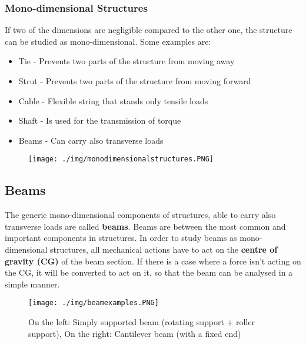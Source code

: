 \subsubsection{Mono-dimensional Structures}
If two of the dimensions are negligible compared to the other one, the structure can be studied as mono-dimensional. Some examples are:
\begin{itemize}[noitemsep]
  \item Tie - Prevents two parts of the structure from moving away
  \item Strut - Prevents two parts of the structure from moving forward
  \item Cable - Flexible string that stands only tensile loads
  \item Shaft - Is used for the transmission of torque
  \item Beams - Can carry also transverse loads
\end{itemize}
\begin{figure}[H]
  \centering
  \texttt{[image: ./img/monodimensionalstructures.PNG]}
\end{figure}
\subsection{Beams}
The generic mono-dimensional components of structures, able to carry also transverse loads are called \textbf{beams}. Beams are between the most common and important components in structures. In order to study beams as mono-dimensional structures, all mechanical actions have to act on the \textbf{centre of gravity (CG)} of the beam section. If there is a case where a force isn't acting on the CG, it will be converted to act on it, so that the beam can be analysed in a simple manner.
\begin{figure}[H]
  \centering
  \texttt{[image: ./img/beamexamples.PNG]}
  \caption{On the left: Simply supported beam (rotating support + roller support), On the right: Cantilever beam (with a fixed end)}
\end{figure}
